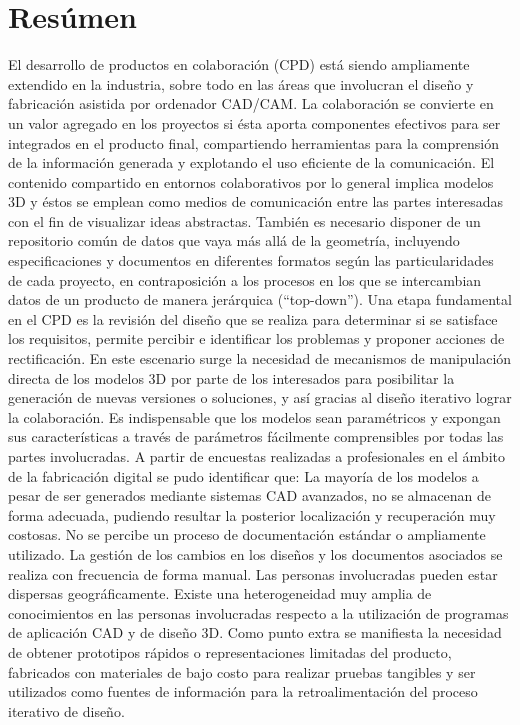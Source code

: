 \section*{Resúmen}
El desarrollo de productos en colaboración (CPD) está siendo ampliamente extendido en la industria, sobre todo en las áreas que involucran el diseño y fabricación asistida por ordenador CAD/CAM.
La colaboración se convierte en un valor agregado en los proyectos si ésta aporta componentes efectivos para ser integrados en el producto final, compartiendo herramientas para la comprensión de la información generada y explotando el uso eficiente de la comunicación.
El contenido compartido en entornos colaborativos por lo general implica modelos 3D y éstos se emplean como medios de comunicación entre las partes interesadas con el fin de visualizar ideas abstractas. También es necesario disponer de un repositorio común de datos que vaya más allá de la geometría, incluyendo especificaciones y documentos en diferentes formatos según las particularidades de cada proyecto, en contraposición a los procesos en los que se intercambian datos de un producto de manera jerárquica (“top-down”).
Una etapa fundamental en el CPD es la revisión del diseño que se realiza para determinar si se satisface los requisitos, permite percibir e identificar los problemas y proponer acciones de rectificación. 
En este escenario surge la necesidad de mecanismos de manipulación directa de los modelos 3D por parte de los interesados para posibilitar la generación de nuevas versiones o soluciones, y así gracias al diseño iterativo lograr la colaboración. Es indispensable que los modelos sean paramétricos y expongan sus características a través de parámetros fácilmente comprensibles por todas las partes involucradas.
A partir de encuestas realizadas a profesionales en el ámbito de la fabricación digital se pudo identificar que:
La mayoría de los modelos a pesar de ser generados mediante sistemas CAD avanzados, no se almacenan de forma adecuada, pudiendo resultar la posterior localización y recuperación muy costosas.
No se percibe un proceso de documentación estándar o ampliamente utilizado.
La gestión de los cambios en los diseños y los documentos asociados se realiza con frecuencia de forma manual.
Las personas involucradas pueden estar dispersas geográficamente.
Existe una heterogeneidad muy amplia de conocimientos en las personas involucradas respecto a la utilización de programas de aplicación CAD y de diseño 3D.
Como punto extra se manifiesta la necesidad de obtener prototipos rápidos o representaciones limitadas del producto, fabricados con materiales de bajo costo para realizar pruebas tangibles y ser utilizados como fuentes de información para la retroalimentación del proceso iterativo de diseño. 

